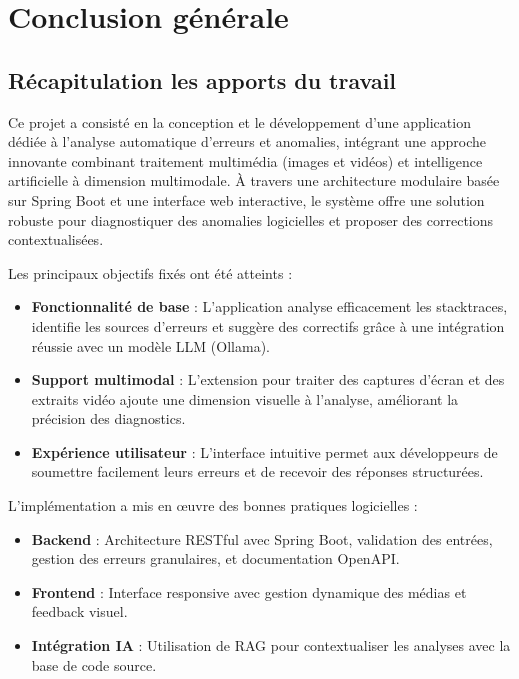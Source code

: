 \documentclass[12pt,a4paper]{report}
\begin{document}
	\chapter*{Conclusion générale}
	
	\section*{Récapitulation les apports du travail}
	
	Ce projet a consisté en la conception et le développement d'une application dédiée à l'analyse automatique d'erreurs et anomalies, intégrant une approche innovante combinant traitement multimédia (images et vidéos) et intelligence artificielle à dimension multimodale. À travers une architecture modulaire basée sur Spring Boot et une interface web interactive, le système offre une solution robuste pour diagnostiquer des anomalies logicielles et proposer des corrections contextualisées.
	
	Les principaux objectifs fixés ont été atteints :  
	
	\begin{itemize}
		
		\item \textbf{Fonctionnalité de base} : L'application analyse efficacement les stacktraces,  identifie les sources d'erreurs et suggère des correctifs grâce à une intégration réussie avec un modèle LLM (Ollama).
		
		\item \textbf{Support multimodal} : L'extension pour traiter des captures d'écran et des extraits vidéo ajoute une dimension visuelle à l'analyse, améliorant la précision des diagnostics.
		
		\item \textbf{Expérience utilisateur} : L'interface intuitive permet aux développeurs de soumettre facilement leurs erreurs et de recevoir des réponses structurées.
		
	\end{itemize}

	L'implémentation a mis en œuvre des bonnes pratiques logicielles :
	
	\begin{itemize}
		
		\item \textbf{Backend} : Architecture RESTful avec Spring Boot, validation des entrées, gestion des erreurs granulaires, et documentation OpenAPI.
		
		\item \textbf{Frontend} : Interface responsive avec gestion dynamique des médias et feedback visuel.
		
		\item \textbf{Intégration IA} : Utilisation de RAG pour contextualiser les analyses avec la base de code source. 
		
	\end{itemize}
	
\end{document}
